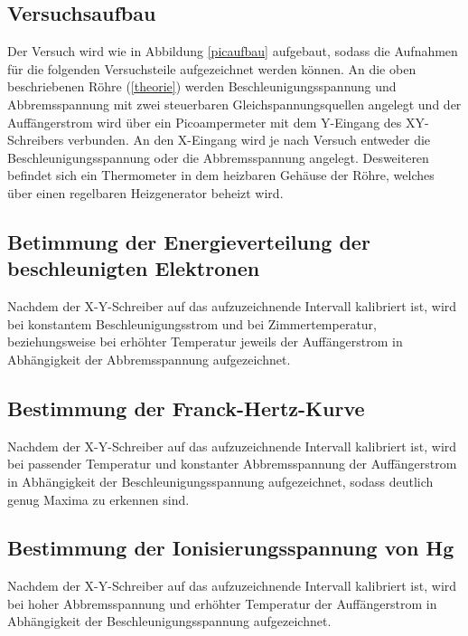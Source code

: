%
\subsection{Versuchsaufbau}

Der Versuch wird wie in Abbildung \ref{picaufbau} aufgebaut, sodass
die Aufnahmen für die folgenden Versuchsteile aufgezeichnet werden können.
An die oben beschriebenen Röhre (\ref{theorie}) werden Beschleunigungsspannung
und Abbremsspannung mit zwei steuerbaren Gleichspannungsquellen angelegt und der
Auffängerstrom wird über ein Picoampermeter  mit dem Y-Eingang des XY-Schreibers
verbunden. An den X-Eingang wird je nach Versuch entweder die Beschleunigungsspannung
oder die Abbremsspannung angelegt. Desweiteren befindet sich ein Thermometer in dem 
heizbaren Gehäuse der Röhre, welches über einen regelbaren Heizgenerator beheizt wird.
\subsection{Betimmung der Energieverteilung der beschleunigten Elektronen}
Nachdem der X-Y-Schreiber auf das aufzuzeichnende Intervall kalibriert ist, wird
bei konstantem Beschleunigungsstrom und
bei Zimmertemperatur, beziehungsweise bei erhöhter Temperatur
jeweils der Auffängerstrom in Abhängigkeit der Abbremsspannung aufgezeichnet.
\subsection{Bestimmung der Franck-Hertz-Kurve}
Nachdem der X-Y-Schreiber auf das aufzuzeichnende Intervall kalibriert ist, wird
bei passender Temperatur und konstanter Abbremsspannung der Auffängerstrom in 
Abhängigkeit der Beschleunigungsspannung 
aufgezeichnet, sodass deutlich genug Maxima zu erkennen sind.
\subsection{Bestimmung der Ionisierungsspannung von Hg}
Nachdem der X-Y-Schreiber auf das aufzuzeichnende Intervall kalibriert ist, wird
bei hoher Abbremsspannung und erhöhter Temperatur der Auffängerstrom in Abhängigkeit 
der Beschleunigungsspannung aufgezeichnet.